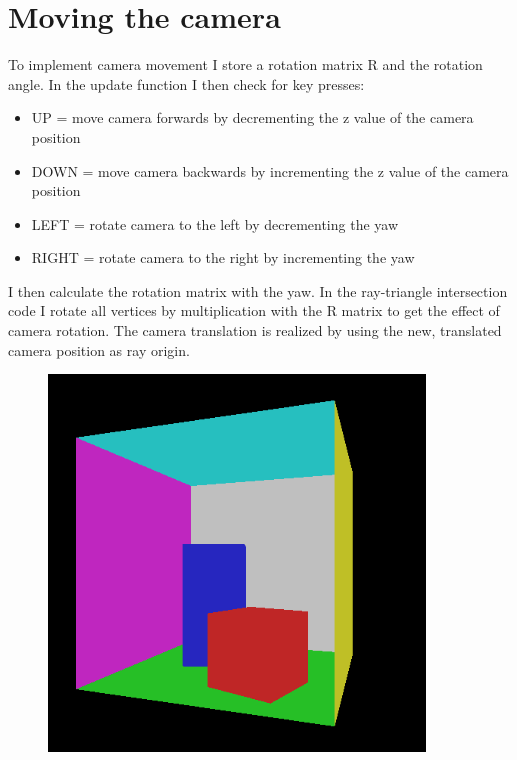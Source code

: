 \section{Moving the camera}
To implement camera movement I store a rotation matrix R and the rotation angle. In the update function I then check for key presses:
\begin{itemize}
    \item UP = move camera forwards by decrementing the z value of the camera position
    \item DOWN = move camera backwards by incrementing the z value of the camera position
    \item LEFT = rotate camera to the left by decrementing the yaw
    \item RIGHT = rotate camera to the right by incrementing the yaw
\end{itemize}
I then calculate the rotation matrix with the yaw. In the ray-triangle intersection code I rotate all vertices by multiplication with the R matrix
to get the effect of camera rotation. The camera translation is realized by using the new, translated camera position as ray origin.
\begin{figure}[ht]
    \centering
    \includegraphics[width=10cm]{screenshots/camera_movement.png}
\end{figure}
\clearpage

